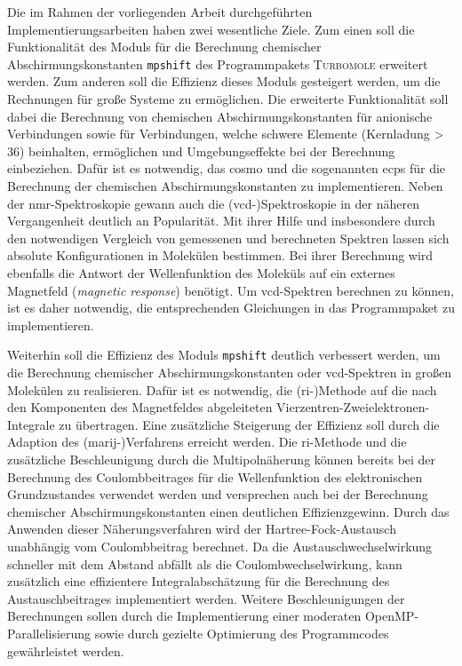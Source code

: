 \bigskip
Die im Rahmen der vorliegenden Arbeit durchgeführten Implementierungsarbeiten haben zwei wesentliche Ziele. Zum einen soll die Funktionalität des Moduls für die Berechnung chemischer Abschirmungskonstanten \texttt{mpshift}\supercite{haser1992direct,kollwitz1996direct} des Programmpakets \textsc{Turbomole}\supercite{ahlrichs1989electronic,TURBOMOLE,furche2014turbomole} erweitert werden. Zum anderen soll die Effizienz dieses Moduls gesteigert werden, um die Rechnungen für große Systeme zu ermöglichen. Die erweiterte Funktionalität soll dabei die Berechnung von chemischen Abschirmungskonstanten für anionische Verbindungen sowie für Verbindungen, welche schwere Elemente (Kernladung > 36) beinhalten, ermöglichen und Umgebungseffekte bei der Berechnung einbeziehen. Dafür ist es notwendig, das \ac{cosmo}\supercite{klamt1993cosmo} und die sogenannten \acp{ecp} für die Berechnung der chemischen Abschirmungskonstanten zu implementieren. Neben der \ac{nmr}-Spektroskopie gewann auch die \mbox{(\acs{vcd}-)}Spektroskopie in der näheren Vergangenheit deutlich an Popularität. Mit ihrer Hilfe und insbesondere durch den notwendigen Vergleich von gemessenen und berechneten Spektren lassen sich absolute Konfigurationen in Molekülen bestimmen. Bei ihrer Berechnung wird ebenfalls die Antwort der Wellenfunktion des Moleküls auf ein externes Magnetfeld (\textit{magnetic response}) benötigt. Um \ac{vcd}-Spektren berechnen zu können, ist es daher notwendig, die entsprechenden Gleichungen in das Programmpaket zu implementieren. 

Weiterhin soll die Effizienz des Moduls \texttt{mpshift} deutlich verbessert werden, um die Berechnung chemischer Abschirmungskonstanten oder \ac{vcd}-Spektren in großen Molekülen zu realisieren. Dafür ist es notwendig, die \mbox{(\acs{ri}-)}Methode\supercite{vahtras1993integral} auf die nach den Komponenten des Magnetfeldes abgeleiteten Vierzentren-Zweielektronen-Integrale zu übertragen. Eine zusätzliche Steigerung der Effizienz soll durch die Adaption des \mbox{(\acs{marij}-)}Verfahrens\supercite{sierka2003fast} erreicht werden. Die \ac{ri}-Methode und die zusätzliche Beschleunigung durch die Multipolnäherung können bereits bei der Berechnung des Coulombbeitrages für die Wellenfunktion des elektronischen Grundzustandes verwendet werden und versprechen auch bei der Berechnung chemischer Abschirmungskonstanten einen deutlichen Effizienzgewinn. Durch das Anwenden dieser Näherungsverfahren wird der Hartree-Fock-Austausch unabhängig vom Coulombbeitrag berechnet. Da die Austauschwechselwirkung schneller mit dem Abstand abfällt als die Coulombwechselwirkung, kann zusätzlich eine effizientere Integralabschätzung für die Berechnung des Austauschbeitrages implementiert werden. Weitere Beschleunigungen der Berechnungen sollen durch die Implementierung einer moderaten OpenMP-Parallelisierung sowie durch gezielte Optimierung des Programmcodes gewährleistet werden. 

